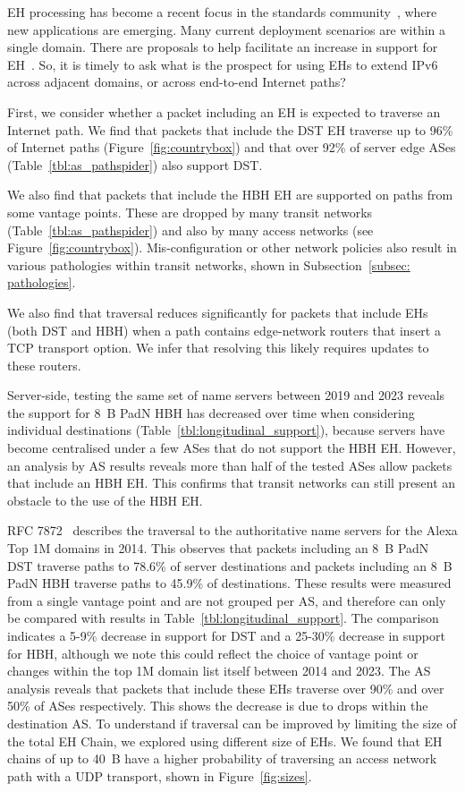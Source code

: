 \documentclass[conference]{IEEEtran}
\begin{document}
EH processing has become a recent focus in the standards community~\cite {ietf-v6ops-hbh-03}, where new applications are emerging. Many current deployment scenarios are within a single domain. There are proposals to help facilitate an increase in support for EH~\cite{ietf-6man-HBH-processing-06, ietf-6man-eh-limits-02}. 
So, it is timely to ask what is the prospect for using EHs to extend IPv6 across adjacent domains, or across end-to-end Internet paths?

First, we consider whether a packet including an EH is expected to traverse an Internet path.
We find that packets that include the DST EH traverse up to 96\% of Internet paths (Figure~\ref{fig:countrybox}) and that over 92\% of server edge ASes (Table~\ref{tbl:as_pathspider}) also support DST.


We also find that packets that include the HBH EH are supported on paths from some vantage points. These are dropped by many transit networks  (Table~\ref{tbl:as_pathspider}) and also by many access networks (see Figure~\ref{fig:countrybox}). Mis-configuration or other network policies also result in various pathologies within transit networks, shown in Subsection~\ref{subsec: pathologies}. 

We also find that traversal reduces significantly for packets that include EHs (both DST and HBH) when a path contains edge-network routers that insert a TCP transport option. We infer that resolving this likely requires updates to these routers.

Server-side, testing the same set of name servers between 2019 and 2023 reveals the support for 8~B PadN HBH has decreased over time when considering individual destinations (Table~\ref{tbl:longitudinal_support}), because servers have become centralised under a few ASes that do not support the HBH EH.  However, an analysis by AS results reveals more than half of the tested ASes allow packets that include an HBH EH. This confirms that transit networks can still present an obstacle to the use of the HBH EH.

RFC 7872~\cite{RFC7872} describes the traversal to the authoritative name servers for the Alexa Top 1M domains in 2014. This observes that packets including an 8~B PadN DST traverse paths to 78.6\% of server destinations and packets including an 8~B PadN HBH traverse paths to 45.9\% of destinations. These results were measured from a single vantage point and are not grouped per AS, and therefore can only be compared with results in Table~\ref{tbl:longitudinal_support}. The comparison indicates a 5-9\% decrease in support for DST and a 25-30\% decrease in support for HBH, although we note this could reflect the choice of vantage point or changes within the top 1M domain list itself between 2014 and 2023.
The AS analysis reveals that packets that include these EHs traverse over 90\% and over 50\% of ASes respectively. This shows the decrease is due to drops within the destination AS.
To understand if traversal can be improved by limiting the size of the total EH Chain, we explored using different size of EHs. We found that EH chains of up to 40~B have a higher probability of traversing an access network path with a UDP transport, shown in Figure~\ref{fig:sizes}.
\end{document}
